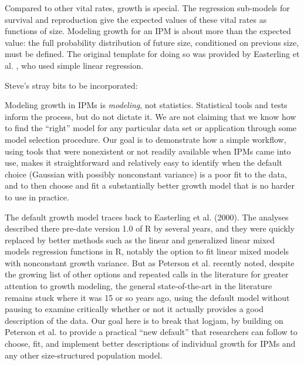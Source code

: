 \documentclass[11pt]{article}
\begin{document}
{Compared to other vital rates, growth is special. 
The regression sub-models for survival and reproduction give the expected values of these vital rates as functions of size. 
Modeling growth for an IPM is about more than the expected value: the full  probability distribution of future size, conditioned on previous size, must be defined. 
The original template for doing so was provided by Easterling et al. \citeyear{easterling2000size}, who used simple linear regression. 

Steve's stray bits to be incorporated: 

Modeling growth in IPMs is \emph{modeling}, not statistics. Statistical tools and tests inform the process, but do
not dictate it. We are not claiming that we know how to find the ``right'' model for any particular data set or
application through some model selection procedure. Our goal is to demonstrate how a simple workflow, using tools 
that were nonexistent or not readily available when IPMs came into use, makes it straightforward and relatively 
easy to identify when the default choice (Gaussian with possibly nonconstant variance) is a poor fit to the data, 
and to then choose and fit a substantially better growth model that is no harder to use in practice. 

The default growth model traces back to Easterling et al. (2000). The analyses described
there pre-date version 1.0 of R by several years, and they were quickly replaced by better methods such 
as the linear and generalized linear mixed models regression functions in R, notably the option to fit 
linear mixed models with nonconstant growth variance. But as Peterson et al. recently
noted, despite the growing list of other options and repeated calls in the literature 
for greater attention to growth modeling, the general state-of-the-art in the literature remains stuck
where it was 15 or so years ago, using the default model without pausing to examine critically whether or
not it actually provides a good description of the data. Our goal here is to break that logjam, by building on Peterson et al.
to provide a practical ``new default'' that researchers can follow to choose, fit, and implement better descriptions
of individual growth for IPMs and any other size-structured population model. 

}
\end{document}
